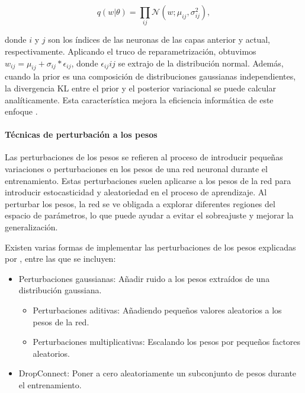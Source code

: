\documentclass[10pt, oneside, a4paper]{article}
\begin{document}
	\begin{equation} \label{eq:11}
	q(w|\theta) = \prod_{ij} \mathcal{N} (w;\mu_{ij}, \sigma^{2}_{ij}),
	\end{equation}	

	donde $i$ y $j$ son los índices de las neuronas de las capas anterior y actual, respectivamente. Aplicando el truco de reparametrización, obtuvimos $w_{ij} = \mu_{ij} + \sigma_{ij} * \epsilon_{ij}$, donde $\epsilon_{ij}ij$ se extrajo de la distribución normal. Además, cuando la prior es una composición de distribuciones gaussianas independientes, la divergencia KL entre el prior y el posterior variacional se puede calcular analíticamente. Esta característica mejora la eficiencia informática de este enfoque \cite{mnf}.

	\paragraph{Técnicas de perturbación a los pesos}

	Las perturbaciones de los pesos se refieren al proceso de introducir pequeñas variaciones o perturbaciones en los pesos de una red neuronal durante el entrenamiento. Estas perturbaciones suelen aplicarse a los pesos de la red para introducir estocasticidad y aleatoriedad en el proceso de aprendizaje. Al perturbar los pesos, la red se ve obligada a explorar diferentes regiones del espacio de parámetros, lo que puede ayudar a evitar el sobreajuste y mejorar la generalización.

	Existen varias formas de implementar las perturbaciones de los pesos explicadas por \cite{wen2018flipout}, entre las que se incluyen:

	\begin{itemize}
		\item Perturbaciones gaussianas: Añadir ruido a los pesos extraídos de una distribución gaussiana.
		\begin{itemize}
			\item Perturbaciones aditivas: Añadiendo pequeños valores aleatorios a los pesos de la red.
			\item Perturbaciones multiplicativas: Escalando los pesos por pequeños factores aleatorios.
		\end{itemize}
		\item DropConnect: Poner a cero aleatoriamente un subconjunto de pesos durante el entrenamiento.
		
	\end{itemize}
\end{document}
